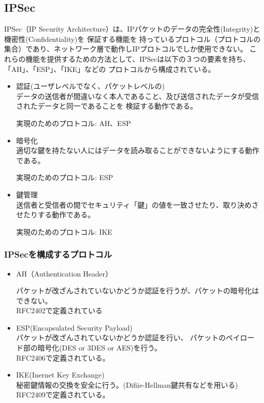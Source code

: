 \documentclass[12pt,a4paper,titlepage]{jreport}
\begin{document}
\subsection{IPSec}
IPSec（IP Security Architecture）は、IPパケットのデータの完全性(Integrity)と機密性(Confidentiality)を
保証する機能を
持っているプロトコル（プロトコルの集合）であり、ネットワーク層で動作しIPプロトコルでしか使用できない。
これらの機能を提供するための方法として、IPSecは以下の３つの要素を持ち、「AH」、「ESP」、「IKE」などの
プロトコルから構成されている。
\begin{itemize}
    \item 認証(ユーザレベルでなく、パケットレベルの)\mbox{}\\
    データの送信者が間違いなく本人であること、及び送信されたデータが受信されたデータと同一であることを
    検証する動作である。\par
    実現のためのプロトコル: AH、ESP
    \item 暗号化\mbox{}\\
    適切な鍵を持たない人にはデータを読み取ることができないようにする動作である。\par
    実現のためのプロトコル: ESP
    \item 鍵管理\mbox{}\\
    送信者と受信者の間でセキュリティ「鍵」の値を一致させたり、取り決めさせたりする動作である。\par
    実現のためのプロトコル: IKE
\end{itemize}

\subsubsection{IPSecを構成するプロトコル}

\begin{itemize}
    \item AH（Authentication Header）\mbox{}\par
    パケットが改ざんされていないかどうか認証を行うが、パケットの暗号化はできない。\\RFC2402\cite{RFC2402}で定義されている

    \item ESP(Encapsulated Security Payload)\mbox{}\\
    パケットが改ざんされていないかどうか認証を行い、
    パケットのペイロード部の暗号化(DES or 3DES or AES)を行う。\\RFC2406\cite{RFC2406}で定義されている。 
    \item IKE(Inernet Key Exchange)\mbox{}\\
    秘密鍵情報の交換を安全に行う。(Difiie-Hellman鍵共有などを用いる)
    \\RFC2409\cite{RFC2409}で定義されている。
\end{itemize}
\end{document}
